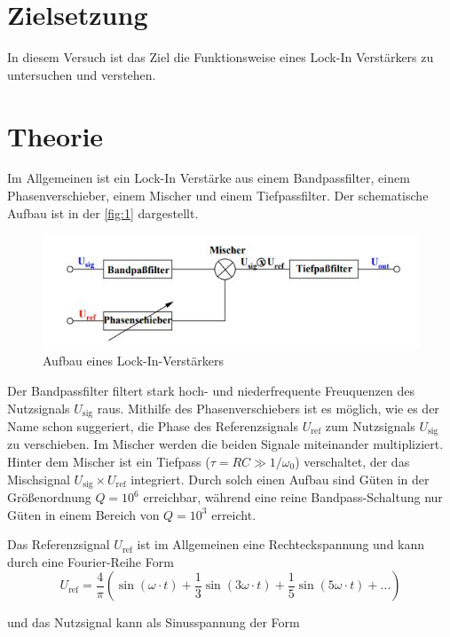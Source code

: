 \section*{Zielsetzung}
In diesem Versuch ist das Ziel die Funktionsweise eines Lock-In Verstärkers zu untersuchen und verstehen.

\section{Theorie}
Im Allgemeinen ist ein Lock-In Verstärke aus einem Bandpassfilter, einem Phasenverschieber, einem Mischer und einem Tiefpassfilter. Der schematische 
Aufbau ist in der \autoref{fig:1} dargestellt.

\begin{figure}[H]
    \centering
    \includegraphics{Picture/0.jpg}
    \caption{Aufbau eines Lock-In-Verstärkers \cite{V303}}
    \label{fig:1}
\end{figure}

\noindent
Der Bandpassfilter filtert stark hoch- und niederfrequente Freuquenzen des Nutzsignals $U_\text{sig}$ raus. Mithilfe des Phasenverschiebers ist es möglich, wie es der Name schon suggeriert, die Phase des Referenzsignals $U_\text{ref}$ zum Nutzsignals $U_\text{sig}$ zu verschieben. Im Mischer werden die beiden Signale miteinander multipliziert. Hinter dem Mischer ist ein Tiefpass ($\tau = RC ≫ 1/\omega_0$) verschaltet,  der das Mischsignal  $U_\text{sig} \times U_\text{ref}$ integriert. Durch solch einen Aufbau sind Güten in der Größenordnung $Q=10^6$ erreichbar, während eine reine Bandpass-Schaltung nur Güten in einem Bereich von $Q=10^3$ erreicht. \par
Das Referenzsignal $U_\text{ref}$ ist im Allgemeinen eine Rechteckspannung und kann durch eine Fourier-Reihe Form 
\begin{equation}
    U_\text{ref} = \frac{4}{\pi}(\sin(\omega \cdot t) + \frac{1}{3}\sin(3\omega \cdot t) +  \frac{1}{5}\sin(5\omega \cdot t) + ...)
    \label{eqn:uref}
\end{equation}

\noindent
und das Nutzsignal kann als Sinusspannung der Form 

